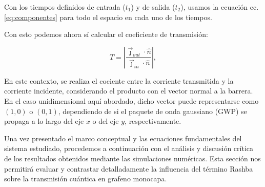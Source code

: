 Con los tiempos definidos de entrada ($t_1$) y de salida ($t_2$), usamos la ecuación ec.\eqref{eq:componentes} para todo el espacio en cada uno de los tiempos.

Con esto podemos ahora sí calcular el coeficiente de transmisión:

\begin{equation}
    \label{eq:transmissionCoef}
    T = \left| \frac{\vec{\jmath}_{out}\cdot\hat{n}}{\vec{\jmath}_{in}\cdot\hat{n}} \right|,
\end{equation}

\noindent En este contexto, se realiza el cociente entre la corriente transmitida y la corriente incidente, considerando el producto con el vector normal a la barrera.
En el caso unidimensional aquí abordado, dicho vector puede representarse como $(1,0)$ o $(0,1)$, dependiendo de si el paquete de onda gaussiano (GWP) se propaga a lo largo del eje $x$ o del eje $y$, respectivamente.

Una vez presentado el marco conceptual y las ecuaciones fundamentales del sistema estudiado, procedemos a continuación con el análisis y discusión crítica de los resultados obtenidos mediante las simulaciones numéricas.
Esta sección nos permitirá evaluar y contrastar detalladamente la influencia del término Rashba sobre la transmisión cuántica en grafeno monocapa.
